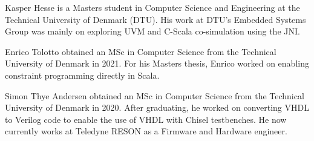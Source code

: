 \documentclass[conference]{IEEEtran}
\begin{document}
\begin{IEEEbiography}{Kasper Hesse}
  is a Masters student in Computer Science and Engineering at the Technical University of Denmark (DTU).
  His work at DTU's Embedded Systems Group was mainly on exploring UVM and C-Scala co-simulation using the JNI.
\end{IEEEbiography}

\begin{IEEEbiography}{Enrico Tolotto}
  obtained an MSc in Computer Science from the Technical University of Denmark in 2021.
  For his Masters thesis, Enrico worked on enabling constraint programming directly in Scala.
\end{IEEEbiography}

\begin{IEEEbiography}{Simon Thye Andersen}
  obtained an MSc in Computer Science from the Technical University of Denmark in 2020.
  After graduating, he worked on converting VHDL to Verilog code to enable the use of VHDL with Chisel testbenches.
  He now currently works at Teledyne RESON as a Firmware and Hardware engineer.
\end{IEEEbiography}
\end{document}
